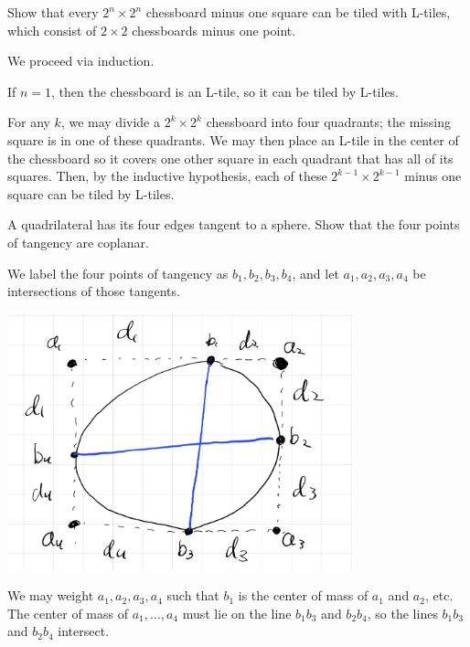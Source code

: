 \documentclass[10pt]{mypackage}
\begin{document}
\begin{problem}
  Show that every $2^{n}\times 2^{n}$ chessboard minus one square can be tiled with L-tiles, which consist of $2\times 2$ chessboards minus one point.
\end{problem}
\begin{solution}
  We proceed via induction.\newline

  If $n = 1$, then the chessboard is an L-tile, so it can be tiled by L-tiles.\newline

  For any $k$, we may divide a $2^{k}\times 2^{k}$ chessboard into four quadrants; the missing square is in one of these quadrants. We may then place an L-tile in the center of the chessboard so it covers one other square in each quadrant that has all of its squares. Then, by the inductive hypothesis, each of these $2^{k-1}\times 2^{k-1}$ minus one square can be tiled by L-tiles.
\end{solution}
\begin{problem}
  A quadrilateral has its four edges tangent to a sphere. Show that the four points of tangency are coplanar.
\end{problem}
\begin{solution}
  We label the four points of tangency as $b_1,b_2,b_3,b_4$, and let $a_1,a_2,a_3,a_4$ be intersections of those tangents.
  \begin{center}
    \includegraphics[width=10cm]{images/center_of_mass_problem_48.png}
  \end{center}
  We may weight $a_1,a_2,a_3,a_4$ such that $b_1$ is the center of mass of $a_1$ and $a_2$, etc. The center of mass of $a_1,\dots,a_4$ must lie on the line $b_1b_3$ and $b_2b_4$, so the lines $b_1b_3$ and $b_2b_4$ intersect.
\end{solution}
\end{document}
